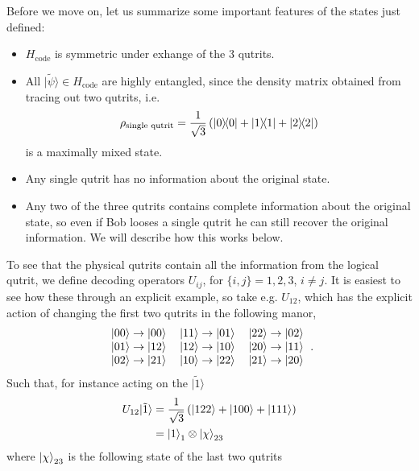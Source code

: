 \documentclass[letter,12pt]{article}
\begin{document}
Before we move on, let us summarize some important features of the states just defined:
\begin{itemize}
	\item $H_{\text{code}}$ is symmetric under exhange of the 3 qutrits.
	\item All $| \tilde \psi \rangle\in H_{\text{code}}$ are highly entangled, since the density matrix obtained from tracing out two qutrits, i.e.
	\begin{equation}
		\begin{aligned}
			\rho_{\text{single qutrit}}=\frac{1}{\sqrt{3}}
			\left(\dyad{0}{0}+\dyad{1}{1}+\dyad{2}{2}\right)	\end{aligned}
	\end{equation}
is a maximally mixed state. 
\item Any single qutrit has no information about the original state.
\item Any two of the three qutrits contains complete information about the original state, so even if Bob looses a single qutrit he can still recover the original information. We will describe how this works below.
\end{itemize}
To see that the physical qutrits contain all the information from the logical qutrit, we define decoding operators $U_{ij}$, for $\{i,j\}=1,2,3$, $i\neq j$. It is easiest to see how these through an explicit example, so take e.g. $U_{12}$, which has the explicit action of changing the first two qutrits in the following manor,
\begin{align}
	\begin{tabular}{ l c r }
		$|00\rangle\to|00\rangle$ & $|11\rangle \to |01\rangle$ & $|22\rangle\to |02\rangle$ \\ 
		$|01\rangle \to |12\rangle$ & $|12\rangle \to |10\rangle$ & $|20\rangle \to |11\rangle$ \\
		$|02\rangle\to |21\rangle$ & $|10\rangle\to|22\rangle$ & $|21\rangle \to |20\rangle$ 
	\end{tabular}.
\end{align}
Such that, for instance acting on the $|\tilde 1\rangle$
\begin{equation}
	\begin{aligned}
		U_{12}|\tilde 1\rangle&=\frac{1}{\sqrt{3}}\left(\ket{122}+\ket{100}+\ket{111}\right)
		\\
		&=\ket{1}_1\otimes \ket{\chi}_{23}
	\end{aligned}
\end{equation}
where $\ket{\chi}_{23}$ is the following state of the last two qutrits
\end{document}
